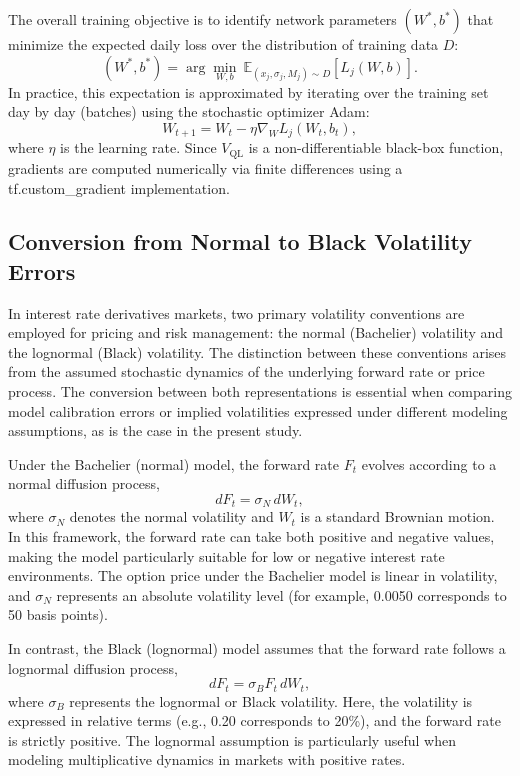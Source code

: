 {The overall training objective is to identify network parameters $(W^*, b^*)$ that minimize the expected daily loss over the distribution of training data $D$:
\begin{equation}
	(W^*, b^*) = \arg \min_{W, b} \ \mathbb{E}_{(x_j, \sigma_j, M_j) \sim D} \left[ L_j(W, b) \right].
\end{equation}
In practice, this expectation is approximated by iterating over the training set day by day (batches) using the stochastic optimizer Adam:
\begin{equation}
	W_{t+1} = W_t - \eta \nabla_W L_j(W_t, b_t),
\end{equation}
where $\eta$ is the learning rate. Since $V_{\text{QL}}$ is a non-differentiable black-box function, gradients are computed numerically via finite differences using a tf.custom\_gradient implementation.

\subsection{Conversion from Normal to Black Volatility Errors}
\label{subsec:conversion_from_normal_to_lognormal_errors}
In interest rate derivatives markets, two primary volatility conventions are employed for pricing and risk management: the normal (Bachelier) volatility and the lognormal (Black) volatility. The distinction between these conventions arises from the assumed stochastic dynamics of the underlying forward rate or price process. The conversion between both representations is essential when comparing model calibration errors or implied volatilities expressed under different modeling assumptions, as is the case in the present study.

Under the Bachelier (normal) model, the forward rate \( F_t \) evolves according to a normal diffusion process,
\begin{equation}
	dF_t = \sigma_N \, dW_t,
\end{equation}
where \( \sigma_N \) denotes the normal volatility and \( W_t \) is a standard Brownian motion. In this framework, the forward rate can take both positive and negative values, making the model particularly suitable for low or negative interest rate environments. The option price under the Bachelier model is linear in volatility, and \( \sigma_N \) represents an absolute volatility level (for example, 0.0050 corresponds to 50 basis points).

In contrast, the Black (lognormal) model assumes that the forward rate follows a lognormal diffusion process,
\begin{equation}
	dF_t = \sigma_B F_t \, dW_t,
\end{equation}
where \( \sigma_B \) represents the lognormal or Black volatility. Here, the volatility is expressed in relative terms (e.g., 0.20 corresponds to 20\%), and the forward rate is strictly positive. The lognormal assumption is particularly useful when modeling multiplicative dynamics in markets with positive rates.

}
